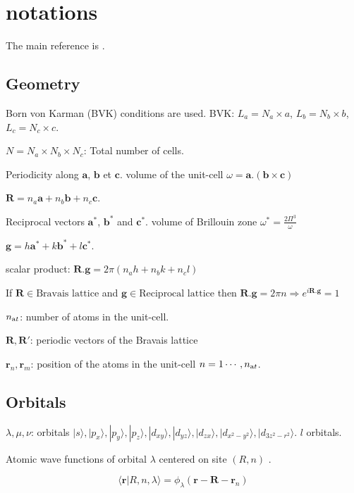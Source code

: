\documentclass{article}
\newcommand{\ket}[1]{|#1\rangle}
\newcommand{\braket}[2]{\langle #1|#2\rangle}
\begin{document}
\section{notations}
The main reference is \cite{barreteauEfficientMagneticTightbinding2016}.

\subsection{Geometry}
\noindent
Born von Karman (BVK) conditions are used.
\noindent
BVK: $L_a=N_a \times a$,\; $L_b=N_b \times b$,\; $L_c=N_c \times c$.

\noindent
$N=N_a \times N_b \times N_c$: Total number of cells.

\noindent
Periodicity along $\mathbf a$, $\mathbf b$ et $\mathbf c$. volume of the unit-cell $\omega=\mathbf{a}.(\mathbf{b} \times \mathbf{c})$

$\mathbf{R}=n_a \mathbf{a}+n_b \mathbf{b}+n_c \mathbf{c}$.

\noindent
Reciprocal vectors  $\mathbf{a}^*$, $\mathbf{b}^*$ and $\mathbf{c}^*$. volume of Brillouin zone $\omega^*= \frac{2\Pi^3}{\omega}$

$\mathbf{g}= h \mathbf{a}^*+k \mathbf{b}^*+l \mathbf{c}^*$.

\noindent
scalar product: $\mathbf{R}.\mathbf{g}=2\pi(n_ah+n_bk+n_cl)$

\noindent
If $\mathbf{R} \in \text{Bravais lattice}$ and $\mathbf{g} \in \text{Reciprocal lattice}$ then $\mathbf{R}.\mathbf{g}=2\pi n \Rightarrow e^{i\mathbf{R}.\mathbf{g}}=1$


\noindent
$n_{\text at}$: number of atoms in the unit-cell.

\noindent
$\mathbf{R}, \mathbf{R}'$: periodic vectors of the Bravais lattice

\noindent $\mathbf{r}_n,\mathbf{r}_m$: position of the atoms in the unit-cell $n=1\cdots, n_{\text at}$.


\subsection{Orbitals}

\noindent
$\lambda, \mu, \nu$: orbitals 
$\ket{s},\ket{p_x},\ket{p_y},\ket{p_z},
\ket{d_{xy}},\ket{d_{yz}},\ket{d_{zx}},\ket{d_{x^2-y^2}},\ket{d_{3z^2-r^2}}$. $l$ orbitals.

\noindent
Atomic wave functions of orbital $\lambda$ centered on site $(R,n)$ .

\[\braket{\mathbf{r}}{R,n,\lambda} = \phi_{\lambda}(\mathbf{r}-\mathbf{R}-\mathbf{r}_n)\]
\end{document}
